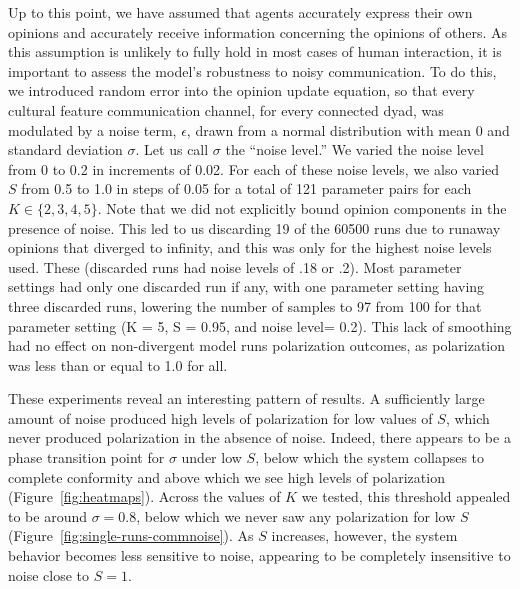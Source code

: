 Up to this point, we have assumed that agents accurately express their own opinions and accurately receive information concerning the opinions of others. As this assumption is unlikely to fully hold in most cases of human interaction, it is important to assess the model's robustness to noisy communication. 
To do this, we introduced random error into the opinion update equation, so that every cultural feature communication
channel, for every connected dyad, was modulated by a noise term, $\epsilon$, 
drawn from a normal 
distribution with mean 0 and standard deviation $\sigma$. 
Let us call $\sigma$ the ``noise level.'' 
We varied the noise level from 0 to 0.2 in increments of 0.02. For each of these
noise levels, we also varied $S$ from 0.5 to 1.0 in steps of 0.05 for a total of
121 parameter pairs for each  $K \in \{2, 3, 4, 5\}$. %
Note that we did not explicitly bound opinion components in the presence of noise. This led to us discarding 19 of the 60500 runs due to runaway opinions that diverged to infinity, and this was only for the highest noise levels used. These  (discarded runs had noise levels of .18 or .2). Most parameter settings had only one discarded run if any, with one parameter setting having three discarded runs, lowering the number of samples to 97 from 100 for that parameter setting (K = 5, S = 0.95, and noise level= 0.2).  This lack of smoothing had no effect on non-divergent model runs polarization outcomes, as polarization was less than or equal to 1.0 for all.

These experiments reveal an interesting pattern of results.
A sufficiently large amount of noise produced high levels of polarization for low values of $S$, which never produced polarization in the absence of noise. 
Indeed, there appears to be a phase transition point for $\sigma$ under low $S$, 
below which the system collapses to complete conformity and above which 
we see high levels of polarization (Figure~\ref{fig:heatmaps}). Across the values of $K$ we tested, this 
threshold appealed to be around $\sigma=0.8$, below which we never saw any 
polarization for low $S$ (Figure~\ref{fig:single-runs-commnoise}). 
As $S$ increases, however, the system behavior becomes less sensitive to 
noise, appearing to be completely insensitive to noise close to $S=1$. 




